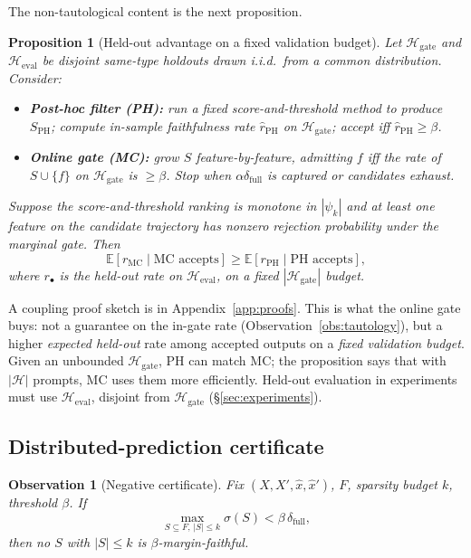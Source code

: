 \documentclass[10pt]{article}
\newtheorem{proposition}[definition]{Proposition}
\newtheorem{observation}[definition]{Observation}
\begin{document}
The non-tautological content is the next proposition.

\begin{proposition}[Held-out advantage on a fixed validation budget]
\label{prop:held-out}
Let $\mathcal{H}_{\text{gate}}$ and $\mathcal{H}_{\text{eval}}$ be disjoint same-type holdouts drawn i.i.d.\ from a common distribution. Consider:
\begin{itemize}
  \item \textbf{Post-hoc filter (PH):} run a fixed score-and-threshold method to produce $S_{\text{PH}}$; compute in-sample faithfulness rate $\hat r_{\text{PH}}$ on $\mathcal{H}_{\text{gate}}$; accept iff $\hat r_{\text{PH}} \geq \beta$.
  \item \textbf{Online gate (MC):} grow $S$ feature-by-feature, admitting $f$ iff the rate of $S \cup \{f\}$ on $\mathcal{H}_{\text{gate}}$ is $\geq \beta$. Stop when $\alpha\delta_{\text{full}}$ is captured or candidates exhaust.
\end{itemize}
Suppose the score-and-threshold ranking is monotone in $|\psi_k|$ and at least one feature on the candidate trajectory has nonzero rejection probability under the marginal gate. Then
\[
\mathbb{E}[r_{\text{MC}} \mid \text{MC accepts}] \geq \mathbb{E}[r_{\text{PH}} \mid \text{PH accepts}],
\]
where $r_\bullet$ is the held-out rate on $\mathcal{H}_{\text{eval}}$, on a fixed $|\mathcal{H}_{\text{gate}}|$ budget.
\end{proposition}

A coupling proof sketch is in Appendix~\ref{app:proofs}. This is what the online gate buys: not a guarantee on the in-gate rate (Observation~\ref{obs:tautology}), but a higher \emph{expected held-out} rate among accepted outputs on a \emph{fixed validation budget}. Given an unbounded $\mathcal{H}_{\text{gate}}$, PH can match MC; the proposition says that with $|\mathcal{H}|$ prompts, MC uses them more efficiently. Held-out evaluation in experiments must use $\mathcal{H}_{\text{eval}}$, disjoint from $\mathcal{H}_{\text{gate}}$ (\S\ref{sec:experiments}).

\subsection{Distributed-prediction certificate}

\begin{observation}[Negative certificate]
\label{obs:distributed}
Fix $(X, X', \hat x, \hat x')$, $F$, sparsity budget $k$, threshold $\beta$. If
\[
\max_{S \subseteq F,\, |S| \leq k} \sigma(S) < \beta \, \delta_{\text{full}},
\]
then no $S$ with $|S| \leq k$ is $\beta$-margin-faithful.
\end{observation}
\end{document}
